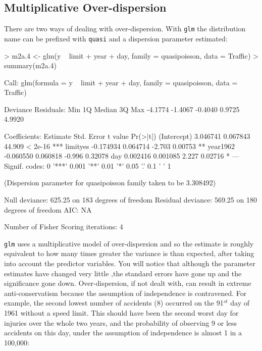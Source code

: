 \documentclass{article}
\begin{document}
\subsection{Multiplicative Over-dispersion}

There are two ways of dealing with over-dispersion. With \texttt{glm} the distribution name can be prefixed with \texttt{quasi} and a dispersion parameter estimated:

\begin{Schunk}
\begin{Sinput}
> m2a.4 <- glm(y ~ limit + year + day, family = quasipoisson, data = Traffic)
> summary(m2a.4)
\end{Sinput}
\begin{Soutput}
Call:
glm(formula = y ~ limit + year + day, family = quasipoisson, 
    data = Traffic)

Deviance Residuals: 
    Min       1Q   Median       3Q      Max  
-4.1774  -1.4067  -0.4040   0.9725   4.9920  

Coefficients:
             Estimate Std. Error t value Pr(>|t|)    
(Intercept)  3.046741   0.067843  44.909  < 2e-16 ***
limityes    -0.174934   0.064714  -2.703  0.00753 ** 
year1962    -0.060550   0.060818  -0.996  0.32078    
day          0.002416   0.001085   2.227  0.02716 *  
---
Signif. codes:  0 '***' 0.001 '**' 0.01 '*' 0.05 '.' 0.1 ' ' 1 

(Dispersion parameter for quasipoisson family taken to be 3.308492)

    Null deviance: 625.25  on 183  degrees of freedom
Residual deviance: 569.25  on 180  degrees of freedom
AIC: NA

Number of Fisher Scoring iterations: 4
\end{Soutput}
\end{Schunk}

\texttt{glm} uses a multiplicative model of over-dispersion and so the estimate is roughly equivalent to how many times greater the variance is than expected, after taking into account the predictor variables. You will notice that although the parameter estimates have changed very little ,the standard errors have gone up and the significance gone down. Over-dispersion, if not dealt with, can result in extreme anti-conservatism because the assumption of independence is contravened. For example, the second lowest number of accidents (8) occurred on the 91$^{st}$ day of 1961 without a speed limit. This should have been the second worst day for injuries over the whole two years, and the probability of observing 9 or less accidents on this day, under the assumption of independence is almost 1 in a 100,000:
\end{document}
